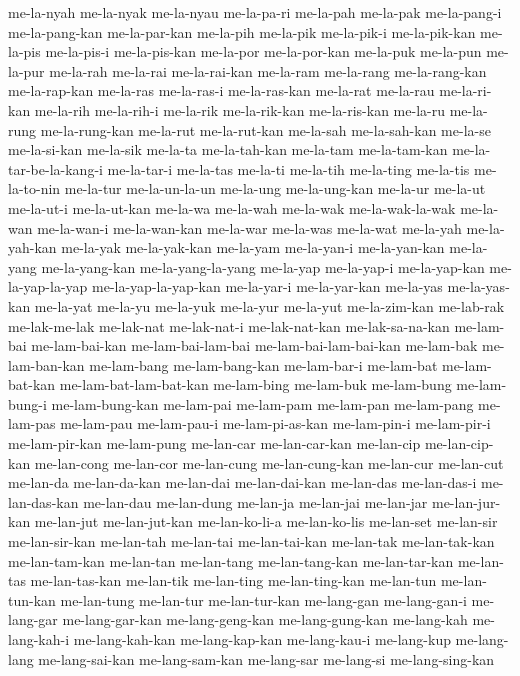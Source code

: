 {me-la-nyah me-la-nyak me-la-nyau me-la-pa-ri me-la-pah me-la-pak
me-la-pang-i me-la-pang-kan me-la-par-kan me-la-pih me-la-pik me-la-pik-i
me-la-pik-kan me-la-pis me-la-pis-i me-la-pis-kan me-la-por me-la-por-kan
me-la-puk me-la-pun me-la-pur me-la-rah me-la-rai me-la-rai-kan me-la-ram
me-la-rang me-la-rang-kan me-la-rap-kan me-la-ras me-la-ras-i
me-la-ras-kan me-la-rat me-la-rau me-la-ri-kan me-la-rih me-la-rih-i
me-la-rik me-la-rik-kan me-la-ris-kan me-la-ru me-la-rung me-la-rung-kan
me-la-rut me-la-rut-kan me-la-sah me-la-sah-kan me-la-se me-la-si-kan
me-la-sik me-la-ta me-la-tah-kan me-la-tam me-la-tam-kan
me-la-tar-be-la-kang-i me-la-tar-i me-la-tas me-la-ti me-la-tih me-la-ting
me-la-tis me-la-to-nin me-la-tur me-la-un-la-un me-la-ung me-la-ung-kan
me-la-ur me-la-ut me-la-ut-i me-la-ut-kan me-la-wa me-la-wah me-la-wak
me-la-wak-la-wak me-la-wan me-la-wan-i me-la-wan-kan me-la-war me-la-was
me-la-wat me-la-yah me-la-yah-kan me-la-yak me-la-yak-kan me-la-yam
me-la-yan-i me-la-yan-kan me-la-yang me-la-yang-kan me-la-yang-la-yang
me-la-yap me-la-yap-i me-la-yap-kan me-la-yap-la-yap me-la-yap-la-yap-kan
me-la-yar-i me-la-yar-kan me-la-yas me-la-yas-kan me-la-yat me-la-yu
me-la-yuk me-la-yur me-la-yut me-la-zim-kan me-lab-rak me-lak-me-lak
me-lak-nat me-lak-nat-i me-lak-nat-kan me-lak-sa-na-kan me-lam-bai
me-lam-bai-kan me-lam-bai-lam-bai me-lam-bai-lam-bai-kan me-lam-bak
me-lam-ban-kan me-lam-bang me-lam-bang-kan me-lam-bar-i me-lam-bat
me-lam-bat-kan me-lam-bat-lam-bat-kan me-lam-bing me-lam-buk me-lam-bung
me-lam-bung-i me-lam-bung-kan me-lam-pai me-lam-pam me-lam-pan me-lam-pang
me-lam-pas me-lam-pau me-lam-pau-i me-lam-pi-as-kan me-lam-pin-i
me-lam-pir-i me-lam-pir-kan me-lam-pung me-lan-car me-lan-car-kan
me-lan-cip me-lan-cip-kan me-lan-cong me-lan-cor me-lan-cung
me-lan-cung-kan me-lan-cur me-lan-cut me-lan-da me-lan-da-kan me-lan-dai
me-lan-dai-kan me-lan-das me-lan-das-i me-lan-das-kan me-lan-dau
me-lan-dung me-lan-ja me-lan-jai me-lan-jar me-lan-jur-kan me-lan-jut
me-lan-jut-kan me-lan-ko-li-a me-lan-ko-lis me-lan-set me-lan-sir
me-lan-sir-kan me-lan-tah me-lan-tai me-lan-tai-kan me-lan-tak
me-lan-tak-kan me-lan-tam-kan me-lan-tan me-lan-tang me-lan-tang-kan
me-lan-tar-kan me-lan-tas me-lan-tas-kan me-lan-tik me-lan-ting
me-lan-ting-kan me-lan-tun me-lan-tun-kan me-lan-tung me-lan-tur
me-lan-tur-kan me-lang-gan me-lang-gan-i me-lang-gar me-lang-gar-kan
me-lang-geng-kan me-lang-gung-kan me-lang-kah me-lang-kah-i
me-lang-kah-kan me-lang-kap-kan me-lang-kau-i me-lang-kup me-lang-lang
me-lang-sai-kan me-lang-sam-kan me-lang-sar me-lang-si me-lang-sing-kan
}
